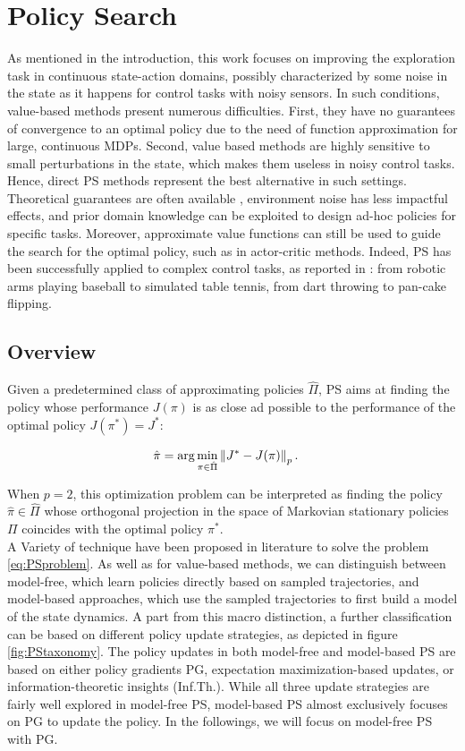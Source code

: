 \section{Policy Search}
As mentioned in the introduction, this work focuses on improving the exploration task in continuous state-action domains, possibly characterized by some noise in the state as it happens for control tasks with noisy sensors. In such conditions, value-based methods present numerous difficulties. First, they have no guarantees of convergence to an optimal policy due to the need of function approximation for large, continuous \gls{MDP}s. Second, value based methods are highly sensitive to small perturbations in the state, which makes them useless in noisy control tasks. Hence, direct \gls{PS} methods represent the best alternative in such settings. Theoretical guarantees are often available \cite{more1994line}, environment noise has less impactful effects, and prior domain knowledge can be exploited to design ad-hoc policies for specific tasks. Moreover, approximate value functions can still be used to guide the search for the optimal policy, such as in actor-critic methods. Indeed, \gls{PS} has been successfully applied to complex control tasks, as reported in \cite{deisenroth2013survey}: from robotic arms playing baseball to simulated table tennis, from dart throwing to pan-cake flipping. 

\subsection{Overview}
Given a predetermined class of approximating policies $\hat{\Pi}$, \gls{PS} aims at finding the policy whose performance $J(\pi)$ is as close ad possible to the performance of the optimal policy $J(\pi^*)=J^*$:

\begin{align}
\hat{\pi} &= \arg \min_{\pi\in\hat{\Pi}}\left\lVert J^*-J(\pi)\right\rVert_p. \label{eq:PSproblem}
\end{align}

When $p=2$, this optimization problem can be interpreted as finding the policy $\hat{\pi}\in\hat{\Pi}$ whose orthogonal projection in the space of Markovian stationary policies $\Pi$ coincides with the optimal policy $\pi^*$. \\
A Variety of technique have been proposed in literature to solve the problem \ref{eq:PSproblem}. As well as for value-based methods, we can distinguish between model-free, which learn policies directly based on sampled trajectories, and model-based approaches, which use the sampled trajectories to first build a model of the state dynamics. A part from this macro distinction, a further classification can be based on different policy update strategies, as depicted in figure \ref{fig:PStaxonomy}. The policy updates in both model-free and model-based \gls{PS} are based on either policy gradients \gls{PG}, expectation maximization-based updates, or information-theoretic insights (Inf.Th.). While all three update strategies are fairly well explored in model-free \gls{PS}, model-based \gls{PS} almost exclusively focuses on \gls{PG} to update the policy. In the followings, we will focus on model-free \gls{PS} with \gls{PG}.

